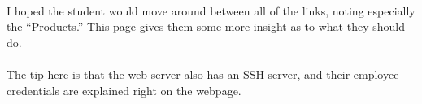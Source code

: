 \documentclass[11pt]{article}
\begin{document}
	\begin{center}
		\graphicspath{ {.} }
		\centering
	\end{center}	


	\paragraph{} I hoped the student would move around between all of the links, noting especially the ``Products.'' This page gives them some more insight as to what they should do. \\

		\begin{center}
		\graphicspath{ {.} }
		\centering
	\end{center}	

	\newpage

	\paragraph{} The tip here is that the web server also has an SSH server, and their employee credentials are explained right on the webpage.
\end{document}
